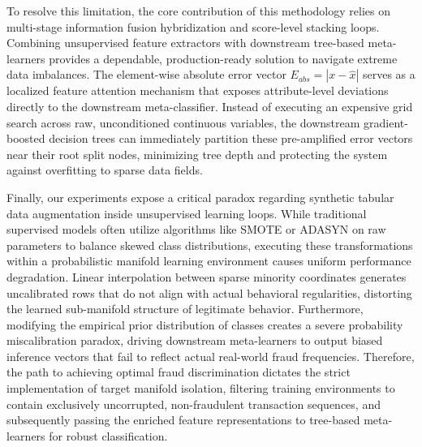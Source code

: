 \documentclass[11pt,a4paper]{report}
\begin{document}
To resolve this limitation, the core contribution of this methodology relies on multi-stage information fusion hybridization and score-level stacking loops. Combining unsupervised feature extractors with downstream tree-based meta-learners provides a dependable, production-ready solution to navigate extreme data imbalances. The element-wise absolute error vector $E_{abs}=|x-\hat{x}|$ serves as a localized feature attention mechanism that exposes attribute-level deviations directly to the downstream meta-classifier. Instead of executing an expensive grid search across raw, unconditioned continuous variables, the downstream gradient-boosted decision trees can immediately partition these pre-amplified error vectors near their root split nodes, minimizing tree depth and protecting the system against overfitting to sparse data fields. 

Finally, our experiments expose a critical paradox regarding synthetic tabular data augmentation inside unsupervised learning loops. While traditional supervised models often utilize algorithms like SMOTE or ADASYN on raw parameters to balance skewed class distributions, executing these transformations within a probabilistic manifold learning environment causes uniform performance degradation. Linear interpolation between sparse minority coordinates generates uncalibrated rows that do not align with actual behavioral regularities, distorting the learned sub-manifold structure of legitimate behavior. Furthermore, modifying the empirical prior distribution of classes creates a severe probability miscalibration paradox, driving downstream meta-learners to output biased inference vectors that fail to reflect actual real-world fraud frequencies. Therefore, the path to achieving optimal fraud discrimination dictates the strict implementation of target manifold isolation, filtering training environments to contain exclusively uncorrupted, non-fraudulent transaction sequences, and subsequently passing the enriched feature representations to tree-based meta-learners for robust classification.
\end{document}
